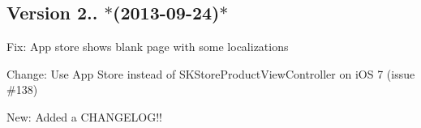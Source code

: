 \subsection*{Version 2.. $\ast$(2013-\/09-\/24)$\ast$ }


\begin{DoxyItemize}
\item Fix\-: App store shows blank page with some localizations
\item Change\-: Use App Store instead of S\-K\-Store\-Product\-View\-Controller on i\-O\-S 7 (issue \#138)
\item New\-: Added a C\-H\-A\-N\-G\-E\-L\-O\-G!! 
\end{DoxyItemize}